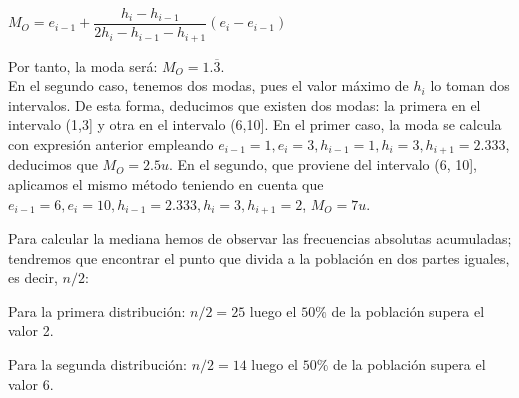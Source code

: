 \begin{center}
	$M_O = e_{i-1} + \dfrac{h_i - h_{i-1}}{2h_i - h_{i-1} - h_{i+1}} (e_i - e_{i-1})$
\end{center}

Por tanto, la moda será: $M_O = 1.\overline{3}$.\\


En el segundo caso, tenemos dos modas, pues el valor máximo de $h_{i}$ lo toman dos intervalos. De esta forma, deducimos que existen dos modas: la primera en el intervalo (1,3] y otra en el intervalo (6,10]. En el primer caso, la moda se calcula con expresión anterior empleando $e_{i-1} = 1, e_i=3, h_{i-1} = 1, h_i = 3, h_{i+1} = 2.333 $, deducimos que $M_O = 2.5 u$. En el segundo, que proviene del intervalo (6, 10], aplicamos el mismo método teniendo en cuenta que $e_{i-1} = 6, e_i=10, h_{i-1} = 2.333, h_i = 3, h_{i+1} = 2 $, $M_O = 7 u$.

\subproblem

Para calcular la mediana hemos de observar las frecuencias absolutas acumuladas; tendremos que encontrar el punto que divida a la población en dos partes iguales, es decir, $n/2$:

Para la primera distribución: $n/2 = 25$ luego el $50\%$ de la población supera el valor 2.

Para la segunda distribución: $n/2 = 14$ luego el $50\%$ de la población supera el valor 6.\\
\\

\subproblem

